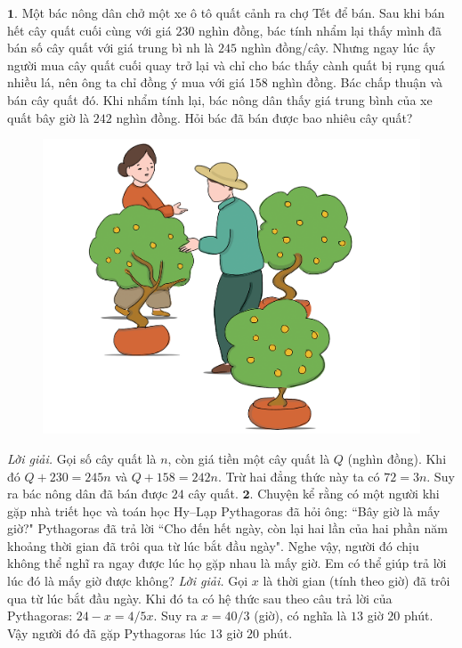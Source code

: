 \begin{multicols}{2}
	$\pmb{1.}$ Một bác nông dân chở một xe ô tô quất cảnh ra chợ Tết để bán. Sau khi bán hết cây quất cuối cùng với giá $230$ nghìn đồng, bác tính nhẩm lại thấy mình đã bán số cây quất với giá trung bì nh là $245$ nghìn đồng/cây. Nhưng ngay lúc ấy người mua cây quất cuối quay trở lại và chỉ cho bác thấy cành quất bị rụng quá nhiều lá, nên ông ta chỉ đồng ý mua với giá $158$ nghìn đồng. 
	Bác chấp thuận và bán cây quất đó. Khi nhẩm tính lại, bác nông dân thấy giá trung bình của xe quất bây giờ là $242$ nghìn đồng. Hỏi bác đã bán được bao nhiêu cây quất?
	\begin{figure}[H]
		\centering
		\vspace*{-10pt}
		\captionsetup{labelformat= empty, justification=centering}
		\includegraphics[width=0.7\linewidth]{Pi1_2_Bai1}
		\vspace*{-15pt}
	\end{figure}
	\textit{Lời giải.} Gọi số cây quất là $n$, còn giá tiền một cây quất là $Q$ (nghìn đồng). Khi đó $Q+230 = 245n$ và $Q+ 158 = 242n$. Trừ hai đẳng thức này ta có $72 = 3n$. Suy ra bác nông dân đã bán được $24$ cây quất.
	\vskip 0.1cm
	$\pmb{2.}$ Chuyện kể rằng có một người khi gặp nhà triết học và toán học Hy--Lạp Pythagoras đã hỏi ông: ``Bây giờ là mấy giờ?" Pythagoras đã trả lời ``Cho đến hết ngày, còn lại hai lần của hai phần năm khoảng thời gian đã trôi qua từ lúc bắt đầu ngày". Nghe vậy, người đó chịu không thể nghĩ ra ngay được lúc họ gặp nhau là mấy giờ. Em có thể giúp trả lời lúc đó là mấy giờ được không?
	\vskip 0.1cm
	\textit{Lời giải.} 	Gọi $x$ là thời gian (tính theo giờ) đã trôi qua từ lúc bắt đầu ngày. Khi đó ta có hệ thức sau theo câu trả lời của Pythagoras: $24 - x = 4/5 x$. Suy ra $x = 40/3$ (giờ), có nghĩa là $13$ giờ $20$ phút. Vậy người đó đã gặp Pythagoras lúc $13$ giờ $20$ phút.
	\begin{figure}[H]

\end{figure}
\end{multicols}
